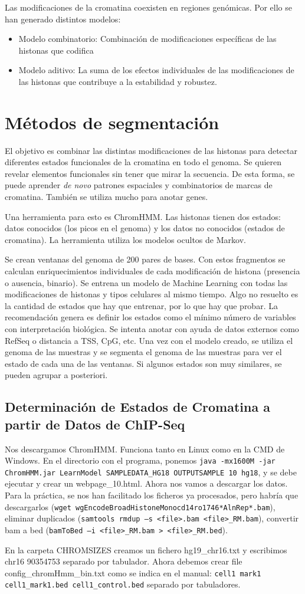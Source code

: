 Las modificaciones de la cromatina coexisten en regiones genómicas. Por ello se han generado distintos modelos:
\begin{itemize}
\item Modelo combinatorio: Combinación de modificaciones específicas de las histonas que codifica
\item Modelo aditivo: La suma de los efectos individuales de las modificaciones de las histonas
que contribuye a la estabilidad y robustez.
\end{itemize}

\section{Métodos de segmentación}
El objetivo es combinar las distintas modificaciones de las histonas para detectar diferentes estados funcionales de la cromatina en todo el genoma. Se quieren revelar elementos funcionales sin tener que mirar la secuencia. De esta forma, se puede aprender \textit{de novo} patrones espaciales y combinatorios de marcas de cromatina. También se utiliza mucho para anotar genes. 

Una herramienta para esto es ChromHMM. Las histonas tienen dos estados: datos conocidos (los picos en el genoma) y los datos no conocidos (estados de cromatina). La herramienta utiliza los modelos ocultos de Markov.

Se crean ventanas del genoma de 200 pares de bases. Con estos fragmentos se calculan enriquecimientos individuales de cada modificación de histona (presencia o ausencia, binario). Se entrena un modelo de Machine Learning con todas las modificaciones de histonas y tipos celulares al mismo tiempo. Algo no resuelto es la cantidad de estados que hay que entrenar, por lo que hay que probar. La recomendación genera es definir los estados como el mínimo número de variables con interpretación biológica. Se intenta anotar con ayuda de datos externos como RefSeq o distancia a TSS, CpG, etc. Una vez con el modelo creado, se utiliza el genoma de las muestras y se segmenta el genoma de las muestras para ver el estado de cada una de las ventanas. Si algunos estados son muy similares, se pueden agrupar a posteriori. 

\subsection{Determinación de Estados de Cromatina a partir de Datos de ChIP-Seq}
Nos descargamos ChromHMM. Funciona tanto en Linux como en la CMD de Windows. En el directorio con el programa, ponemos \texttt{java -mx1600M -jar ChromHMM.jar LearnModel SAMPLEDATA\_HG18 OUTPUTSAMPLE 10 hg18}, y se debe ejecutar y crear un webpage\_10.html. Ahora nos vamos a descargar los datos. Para la práctica, se nos han facilitado los ficheros ya procesados, pero habría que descargarlos (\texttt{wget wgEncodeBroadHistoneMonocd14ro1746*AlnRep*.bam}), eliminar duplicados (\texttt{samtools rmdup –s <file>.bam <file>\_RM.bam}), convertir bam a bed (\texttt{bamToBed –i <file>\_RM.bam > <file>\_RM.bed}). 

En la carpeta CHROMSIZES creamos un fichero hg19\_chr16.txt y escribimos chr16 90354753 separado por tabulador. Ahora debemos crear file config\_chromHmm\_bin.txt como se indica en el manual:
\texttt{cell1 mark1 cell1\_mark1.bed cell1\_control.bed} separado por tabuladores.

